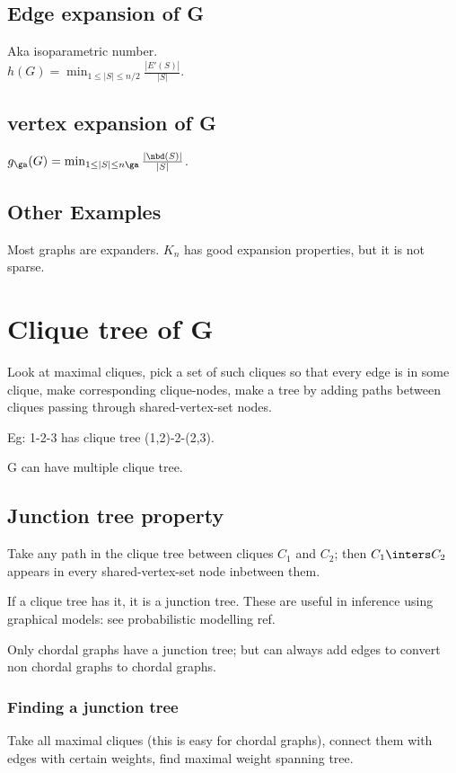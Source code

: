 \documentclass[oneside, article]{memoir}
\begin{document}
\section{Edge expansion of G}
Aka isoparametric number. \\
$h(G) = \min_{1\leq |S| \leq n/2} \frac{|E'(S)|}{|S|}$.

\section{ vertex expansion of G}
$g_{\ga}(G) = \min_{1 \leq |S| \leq n \ga} \frac{|\nbd(S)|}{|S|}$.

\section{Other Examples}
Most graphs are expanders. $K_{n}$ has good expansion properties, but it is not sparse.

\tbc

\chapter{Clique tree of G}
Look at maximal cliques, pick a set of such cliques so that every edge is in some clique, make corresponding clique-nodes, make a tree by adding paths between cliques passing through shared-vertex-set nodes.

Eg: 1-2-3 has clique tree (1,2)-2-(2,3).

G can have multiple clique tree.

\section{Junction tree property}
Take any path in the clique tree between cliques $C_1$ and $C_2$; then $C_1 \inters C_2$ appears in every shared-vertex-set node inbetween them.

If a clique tree has it, it is a junction tree. These are useful in inference using graphical models: see probabilistic modelling ref.

Only chordal graphs have a junction tree; but can always add edges to convert non chordal graphs to chordal graphs.

\subsection{Finding a junction tree}
Take all maximal cliques (this is easy for chordal graphs), connect them with edges with certain weights, find maximal weight spanning tree. \tbc
\end{document}

